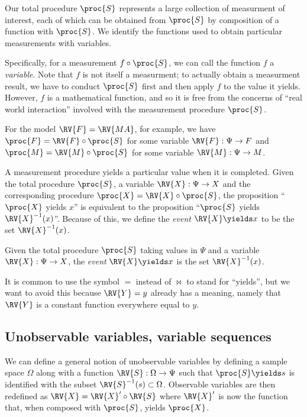 Our total procedure $\proc{S}$ represents a large collection of measurment of interest, each of which can be obtained from $\proc{S}$ by composition of a function with $\proc{S}$. We identify the functions used to obtain particular measurements with variables.

Specifically, for a measurement $f\circ \proc{S}$, we can call the function $f$ a \emph{variable}. Note that $f$ is not itself a measurment; to actually obtain a measurment result, we have to conduct $\proc{S}$ first and then apply $f$ to the value it yields. However, $f$ is a mathematical function, and so it is free from the concerns of ``real world interaction'' involved with the measurement procedure $\proc{S}$.

For the model $\RV{F}=\RV{MA}$, for example, we have $\proc{F}=\RV{F}\circ \proc{S}$ for some variable $\RV{F}:\Psi\to F$ and $\proc{M}=\RV{M}\circ \proc{S}$ for some variable $\RV{M}:\Psi\to M$.

A measurement procedure yields a particular value when it is completed. Given the total procedure $\proc{S}$, a variable $\RV{X}:\Psi\to X$ and the corresponding procedure $\proc{X}=\RV{X}\circ\proc{S}$, the proposition ``$\proc{X}$ yields $x$'' is equivalent to the proposition ``$\proc{S}$ yields $\RV{X}^{-1}(x)$''. Because of this, we define the \emph{event} $\RV{X}\yields x$ to be the set $\RV{X}^{-1}(x)$.

\begin{definition}[Event]
Given the total procedure $\proc{S}$ taking values in $\Psi$ and a variable $\RV{X}:\Psi\to X$, the \emph{event} $\RV{X}\yields x$ is the set $\RV{X}^{-1}(x)$.
\end{definition}

It is common to use the symbol $=$ instead of $\bowtie$ to stand for ``yields'', but we want to avoid this because $\RV{Y}=y$ already has a meaning, namely that $\RV{Y}$ is a constant function everywhere equal to $y$. 

\subsection{Unobservable variables, variable sequences}

We can define a general notion of unobservable variables by defining a sample space $\Omega$ along with a function $\RV{S}:\Omega\to \Psi$ such that $\proc{S}\yields s$ is identified with the subset $\RV{S}^{-1}(s)\subset \Omega$. Observable variables are then redefined as $\RV{X}=\RV{X}'\circ\RV{S}$ where $\RV{X}'$ is now the function that, when composed with $\proc{S}$, yields $\proc{X}$.


